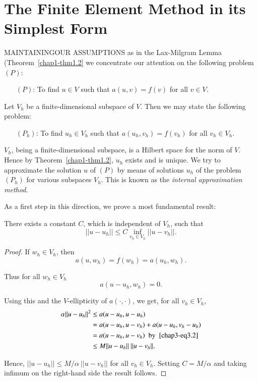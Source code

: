 
\chapter{The Finite Element Method in its Simplest Form}\label{chap3}

MAINTAINING\pageoriginale OUR ASSUMPTIONS as in the Lax-Milgram Lemma
(Theorem~\ref{chap1-thm1.2} we concentrate our attention on the
following problem $(P)$:
\begin{itemize}
\item[$(P)$:] To find $u\in V$ such that $a(u,v)=f(v)$ for all $v\in V$.
\end{itemize}

Let $V_{h}$ be a finite-dimensional subspace of $V$. Then we may state
the following problem:
\begin{itemize}
\item[$(P_{h})$:] To find $u_{h}\in V_{h}$ such that
  $a(u_{h},v_{h})=f(v_{h})$ for all $v_{h}\in V_{h}$.
\end{itemize}

$V_{h}$, being a finite-dimensional subspace, is a Hilbert space for
the norm of $V$. Hence by Theorem~\ref{chap1-thm1.2}, $u_{h}$ exists
and is unique. We try to approximate the solution $u$ of $(P)$ by
means of solutions $u_{h}$ of the problem $(P_{h})$ for various
subspaces $V_{h}$. This is known as the {\em internal approximation
  method.}

As a first step in this direction, we prove a most fundamental result:

\begin{theorem}\label{chap3-thm3.1}
There exists a constant $C$, which is independent of $V_{h}$, such
that
\begin{equation*}
||u-u_{h}||\leq C\mathop{\inf}_{v_{h}\in
  V_{h}}||u-v_{h}||.\tag{3.1}\label{chap3-eq3.1} 
\end{equation*}
\end{theorem}

\begin{proof}
If $w_{h}\in V_{h}$, then
$$
a(u,w_{h})=f(w_{h})=a(u_{h},w_{h}).
$$

Thus for all $w_{h}\in V_{h}$
\begin{equation*}
a(u-u_{h},w_{h})=0.\tag{3.2}\label{chap3-eq3.2}
\end{equation*}

Using this and the $V$-ellipticity of $a(\cdot,\cdot)$, we get, for
all $v_{h}\in V_{h}$,
\begin{align*}
\alpha||u-u_{h}||^{2} &\leq a(u-u_{h},u-u_{h})\\
&= a(u-u_{h},u-v_{h})+a(u-u_{h},v_{h}-u_{h})\\
&= a(u-u_{h},u-v_{h})\text{~ by~ \eqref{chap3-eq3.2}}\\
&\leq M||u-u_{h}||~||u-v_{h}||.
\end{align*}\pageoriginale

Hence, $||u-u_{h}||\leq M/\alpha~||u-v_{h}||$ for all $v_{h}\in
V_{h}$. Setting $C=M/\alpha$ and taking infimum on the right-hand side
the result follows.
\end{proof}

